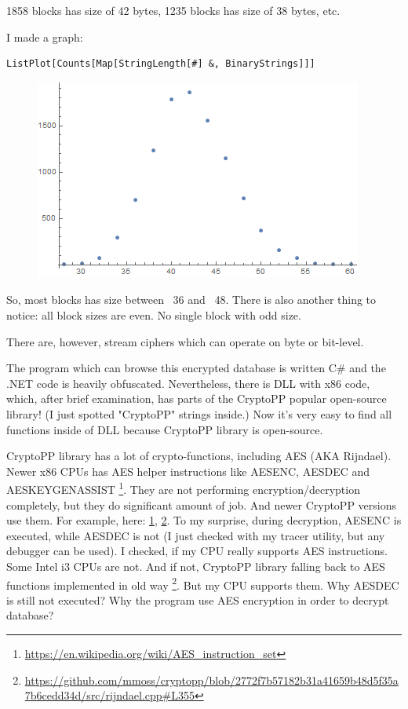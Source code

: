 1858 blocks has size of 42 bytes, 1235 blocks has size of 38 bytes, etc.

I made a graph:

\begin{lstlisting}
ListPlot[Counts[Map[StringLength[#] &, BinaryStrings]]]
\end{lstlisting}

\begin{figure}[H]
\centering
\includegraphics[scale=\FigScale]{examples/encrypted_DB1/lengths.png}
\end{figure}

So, most blocks has size between ~36 and ~48.
There is also another thing to notice: all block sizes are even.
No single block with odd size.

There are, however, stream ciphers which can operate on byte or bit-level.


The program which can browse this encrypted database is written C\# and the .NET code
is heavily obfuscated.
Nevertheless, there is DLL with x86 code, which, after brief examination,
has parts of the CryptoPP popular open-source library!
(I just spotted "CryptoPP" strings inside.)
Now it's very easy to find all functions inside of DLL because CryptoPP library is open-source.

CryptoPP library has a lot of crypto-functions, including AES (AKA Rijndael).
Newer x86 CPUs has AES helper instructions like AESENC, AESDEC and AESKEYGENASSIST
\footnote{\url{https://en.wikipedia.org/wiki/AES_instruction_set}}.
They are not performing encryption/decryption completely, but they do significant amount of job.
And newer CryptoPP versions use them.
For example, here:
\href{https://github.com/mmoss/cryptopp/blob/2772f7b57182b31a41659b48d5f35a7b6cedd34d/src/rijndael.cpp#L1034}{1},
\href{https://github.com/mmoss/cryptopp/blob/2772f7b57182b31a41659b48d5f35a7b6cedd34d/src/rijndael.cpp#L1000}{2}.
To my surprise, during decryption, AESENC is executed, while AESDEC is not 
(I just checked with my tracer utility, but any debugger can be used).
I checked, if my CPU really supports AES instructions. Some Intel i3 CPUs are not.
And if not, CryptoPP library falling back to AES functions implemented in old way
\footnote{\url{https://github.com/mmoss/cryptopp/blob/2772f7b57182b31a41659b48d5f35a7b6cedd34d/src/rijndael.cpp#L355}}.
But my CPU supports them.
Why AESDEC is still not executed?
Why the program use AES encryption in order to decrypt database?

